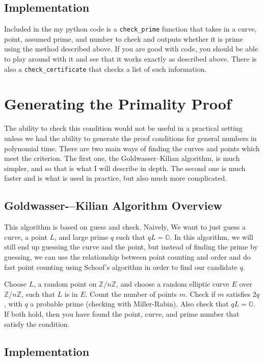 \documentclass[]{article}
\newcommand{\Z}{\mathbb{Z}}
\newcommand{\OS}{\mathbb{O}}
\newcommand{\ZMZ}[1]{\Z/#1\Z}
\begin{document}
\subsection{Implementation}

Included in the my python code is a \texttt{check\_prime} function that takes in a curve, point, assumed prime, and number to check and outputs whether it is prime using the method described above. If you are good with code, you should be able to play around with it and see that it works exactly as described above. There is also a \texttt{check\_certificate} that checks a list of such information. 

\section{Generating the Primality Proof}

The ability to check this condition would not be useful in a practical setting unless we had the ability to generate the proof conditions for general numbers in polynomial time. There are two main ways of finding the curves and points which meet the criterion. The first one, the Goldwasser--Kilian algorithm, is much simpler, and so that is what I will describe in depth. The second one is much faster and is what is used in practice, but also much more complicated.

\subsection{Goldwasser-–Kilian Algorithm Overview}

This algorithm is based on guess and check. Naively, We want to just guess a curve, a point $L$, and large prime $q$ such that $qL = \OS$. In this algorithm, we will still end up guessing the curve and the point, but instead of finding the prime by guessing, we can use the relationship between point counting and order and do fast point counting using Schoof's algorithm in order to find our candidate $q$.

Choose $L$, a random point on  $\ZMZ{n}$, and choose a random elliptic curve $E$ over $\ZMZ{n}$, such that $L$ is in $E$. Count the number of points $m$. Check if $m$ satisfies $2q$, with $q$ a probable prime (checking with Miller-Rabin). Also check that $qL = \OS$. If both hold, then you have found the point, curve, and prime number that satisfy the condition.


\subsection{Implementation}
\end{document}
